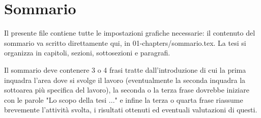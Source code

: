 \newpage
\chapter*{Sommario}
\thispagestyle{empty}

Il presente file contiene tutte le impostazioni grafiche necessarie: il contenuto del sommario va scritto direttamente qui, in 01-chapters/sommario.tex.
La tesi si organizza in capitoli, sezioni, sottosezioni e paragrafi.

Il sommario deve contenere 3 o 4 frasi tratte dall'introduzione di cui la prima inquadra l'area dove si svolge il lavoro (eventualmente la seconda inquadra la sottoarea più specifica del lavoro), la seconda o la terza frase dovrebbe iniziare con le parole "Lo scopo della tesi ..." e infine la terza o quarta frase riassume brevemente l'attività svolta, i risultati ottenuti ed eventuali valutazioni di questi.   

